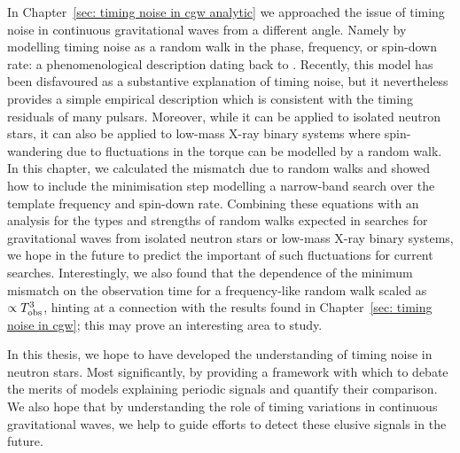 \documentclass[twoside, 11pt]{thesis}
\begin{document}
In Chapter~\ref{sec: timing noise in cgw analytic} we approached the issue of
timing noise in continuous gravitational waves from a different angle. Namely
by modelling timing noise as a random walk in the phase, frequency, or
spin-down rate: a phenomenological description dating back to
\citet{Boynton1972}. Recently, this model has been disfavoured
\citep{Hobbs2010} as a substantive explanation of timing noise, but it
nevertheless provides a simple empirical description which is consistent with
the timing residuals of many pulsars. Moreover, while it can be applied to
isolated neutron stars, it can also be applied to low-mass X-ray binary systems
where spin-wandering due to fluctuations in the torque can be modelled by a
random walk. In this chapter, we calculated the mismatch due to random walks
and showed how to include the minimisation step modelling a narrow-band search
over the template frequency and spin-down rate. Combining these equations with
an analysis for the types and strengths of random walks expected in searches
for gravitational waves from isolated neutron stars or low-mass X-ray binary
systems, we hope in the future to predict the important of such fluctuations
for current searches.  Interestingly, we also found that the dependence of the
minimum mismatch on the observation time for a frequency-like random walk
scaled as $\propto T_{\mathrm{obs}}^{3}$, hinting at a connection with the results found
in Chapter~\ref{sec: timing noise in cgw}; this may prove an interesting area
to study.

In this thesis, we hope to have developed the understanding of timing noise in
neutron stars. Most significantly, by providing a framework with which to debate
the merits of models explaining periodic signals and quantify their comparison.
We also hope that by understanding the role of timing variations in continuous
gravitational waves, we help to guide efforts to detect these elusive signals
in the future.







\end{document}
